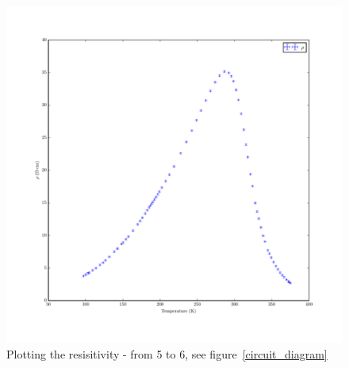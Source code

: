 \documentclass[reprint, nobibnotes, amssymb, amsmath, amsfonts, physics, mathtools, mathrsfs, floatfix]{revtex4-1}
\begin{document}
\begin{widetext}
      \begin{figure}[h]
        \centering
        \includegraphics[width=\linewidth]{../plots/rho_vs_T.pdf}
        \caption{Plotting the resisitivity - from 5 to 6, see figure~\ref{circuit_diagram} \label{rho_vs_T}}
      \end{figure}

    \end{widetext}

  
  
\end{document}
